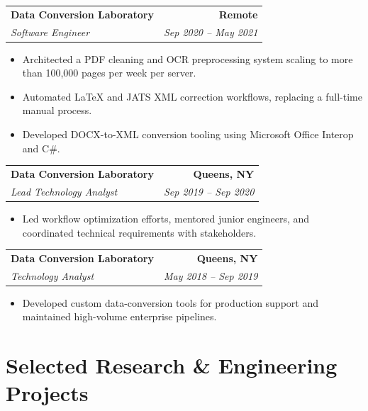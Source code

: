 \documentclass[10pt,letterpaper]{article}
\makeatletter
\newcommand{\job}[4]{%
    \begin{tabularx}{\linewidth}{@{}X r@{}}
        \textbf{#1} & \textbf{#2} \\
        \textit{#3} & \textit{#4}
    \end{tabularx}
    \vspace{-2pt}
}
\makeatother
\begin{document}
\job
  {Data Conversion Laboratory}
  {Remote}
  {Software Engineer}
  {Sep 2020 -- May 2021}

\begin{itemize}
    \item Architected a PDF cleaning and OCR preprocessing system scaling to more
          than 100,000 pages per week per server.
    \item Automated LaTeX and JATS XML correction workflows, replacing a
          full-time manual process.
    \item Developed DOCX-to-XML conversion tooling using Microsoft Office Interop
          and C\#.
\end{itemize}

\vspace{1pt}

\job
  {Data Conversion Laboratory}
  {Queens, NY}
  {Lead Technology Analyst}
  {Sep 2019 -- Sep 2020}

\begin{itemize}
    \item Led workflow optimization efforts, mentored junior engineers, and
          coordinated technical requirements with stakeholders.
\end{itemize}

\vspace{1pt}

\job
  {Data Conversion Laboratory}
  {Queens, NY}
  {Technology Analyst}
  {May 2018 -- Sep 2019}

\begin{itemize}
    \item Developed custom data-conversion tools for production support and
          maintained high-volume enterprise pipelines.
\end{itemize}

\section*{Selected Research \& Engineering Projects}
\end{document}
